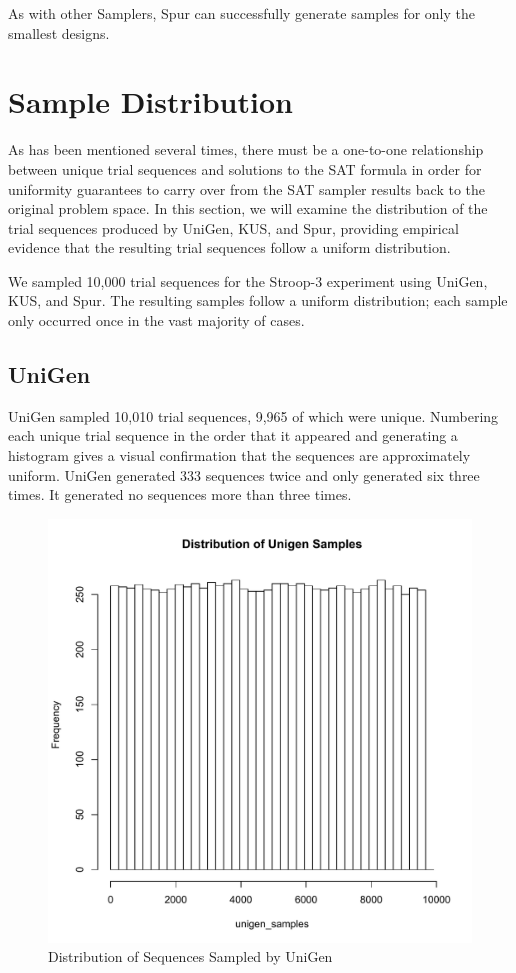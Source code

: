 As with other Samplers, Spur can successfully generate samples for only the smallest designs.


\section{Sample Distribution}

As has been mentioned several times, there must be a one-to-one relationship between unique trial sequences and solutions to the SAT formula in order for uniformity guarantees to carry over from the SAT sampler results back to the original problem space. In this section, we will examine the distribution of the trial sequences produced by UniGen, KUS, and Spur, providing empirical evidence that the resulting trial sequences follow a uniform distribution.

We sampled 10,000 trial sequences for the Stroop-3 experiment using UniGen, KUS, and Spur. The resulting samples follow a uniform distribution; each sample only occurred once in the vast majority of cases.

\subsection{UniGen}

UniGen sampled 10,010 trial sequences, 9,965 of which were unique. Numbering each unique trial sequence in the order that it appeared and generating a histogram gives a visual confirmation that the sequences are approximately uniform. UniGen generated 333 sequences twice and only generated six three times. It generated no sequences more than three times.

\begin{figure}[htb]
\centering
\centerline{\includegraphics[origin=c,width=12cm]{../figures/unigen-samples.pdf}}
\caption{Distribution of Sequences Sampled by UniGen}
\label{fig:unigen_samples}
\end{figure}



